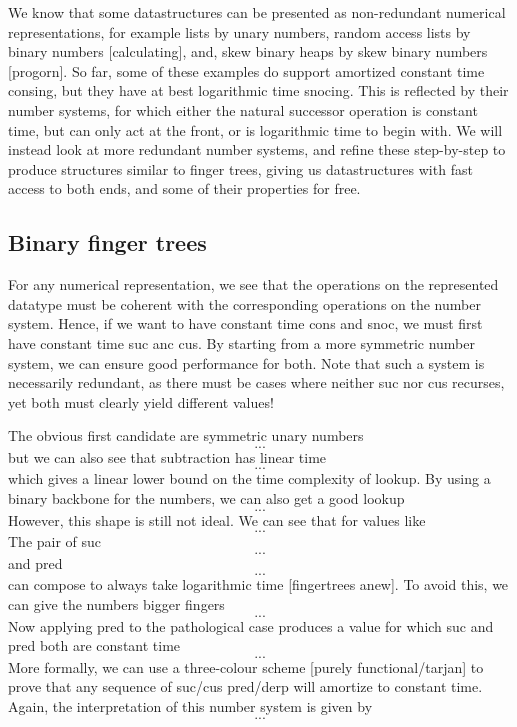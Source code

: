 
We know that some datastructures can be presented as non-redundant numerical representations, for example lists by unary numbers, random access lists by binary numbers [calculating], and, skew binary heaps by skew binary numbers [progorn]. So far, some of these examples do support amortized constant time consing, but they have at best logarithmic time snocing. This is reflected by their number systems, for which either the natural successor operation is constant time, but can only act at the front, or is logarithmic time to begin with. We will instead look at more redundant number systems, and refine these step-by-step to produce structures similar to finger trees, giving us datastructures with fast access to both ends, and some of their properties for free.

\subsection{Binary finger trees}
For any numerical representation, we see that the operations on the represented datatype must be coherent with the corresponding operations on the number system. Hence, if we want to have constant time cons and snoc, we must first have constant time suc anc cus. By starting from a more symmetric number system, we can ensure good performance for both. Note that such a system is necessarily redundant, as there must be cases where neither suc nor cus recurses, yet both must clearly yield different values!

The obvious first candidate are symmetric unary numbers
\[ ... \]
but we can also see that subtraction has linear time
\[ ... \]
which gives a linear lower bound on the time complexity of lookup. By using a binary backbone for the numbers, we can also get a good lookup
\[ ... \]
However, this shape is still not ideal. We can see that for values like
\[ ... \]
The pair of suc
\[ ... \]
and pred
\[ ... \]
can compose to always take logarithmic time [fingertrees anew]. To avoid this, we can give the numbers bigger fingers
\[ ... \]
Now applying pred to the pathological case produces a value for which suc and pred both are constant time
\[ ... \]
More formally, we can use a three-colour scheme [purely functional/tarjan] to prove that any sequence of suc/cus pred/derp will amortize to constant time. Again, the interpretation of this number system is given by
\[ ... \]


